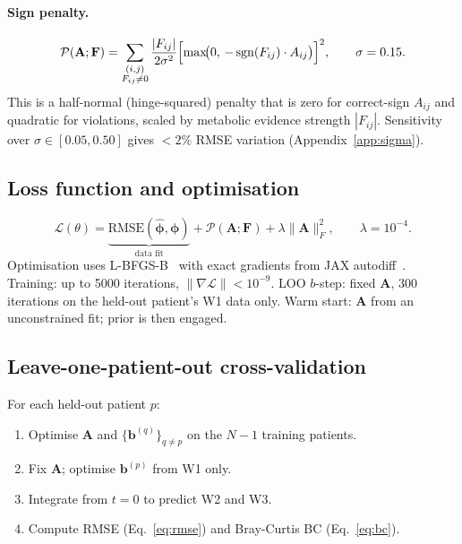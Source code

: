 \documentclass[11pt,a4paper]{article}
\newcommand{\bphi}{\boldsymbol{\phi}}
\newcommand{\bA}{\mathbf{A}}
\newcommand{\bF}{\mathbf{F}}
\newcommand{\bb}{\mathbf{b}}
\newcommand{\sgn}{\operatorname{sgn}}
\newcommand{\calP}{\mathcal{P}}
\newcommand{\calL}{\mathcal{L}}
\begin{document}
\paragraph{Sign penalty.}
\begin{equation}
  \calP(\bA;\bF)
  = \sum_{\substack{(i,j)\\F_{ij}\neq 0}}
    \frac{|F_{ij}|}{2\sigma^2}
    \Bigl[\max\!\bigl(0,\,-\sgn(F_{ij})\cdot A_{ij}\bigr)\Bigr]^2,
  \qquad \sigma = 0.15.
  \label{eq:penalty}
\end{equation}
This is a half-normal (hinge-squared) penalty that is zero for correct-sign $A_{ij}$
and quadratic for violations, scaled by metabolic evidence strength $|F_{ij}|$.
Sensitivity over $\sigma\in[0.05,0.50]$ gives $<2\%$ RMSE variation (Appendix~\ref{app:sigma}).

\subsection{Loss function and optimisation}
\label{ssec:optim}

\begin{equation}
  \calL(\theta)
  = \underbrace{\text{RMSE}(\hat{\bphi},\bphi)}_{\text{data fit}}
  + \calP(\bA;\bF)
  + \lambda\|\bA\|_F^2,
  \qquad \lambda=10^{-4}.
  \label{eq:loss}
\end{equation}
Optimisation uses L-BFGS-B~\citep{byrd1995} with exact gradients from JAX
autodiff~\citep{bradbury2018}.
Training: up to 5000 iterations, $\|\nabla\calL\|<10^{-9}$.
LOO $b$-step: fixed $\bA$, 300 iterations on the held-out patient's W1 data only.
Warm start: $\bA$ from an unconstrained fit; prior is then engaged.

\subsection{Leave-one-patient-out cross-validation}
\label{ssec:loo}

For each held-out patient $p$:
\begin{enumerate}[noitemsep]
  \item Optimise $\bA$ and $\{\bb^{(q)}\}_{q\neq p}$ on the $N-1$ training patients.
  \item Fix $\bA$; optimise $\bb^{(p)}$ from W1 only.
  \item Integrate from $t=0$ to predict W2 and W3.
  \item Compute RMSE (Eq.~\ref{eq:rmse}) and Bray-Curtis BC (Eq.~\ref{eq:bc}).
\end{enumerate}
\end{document}
